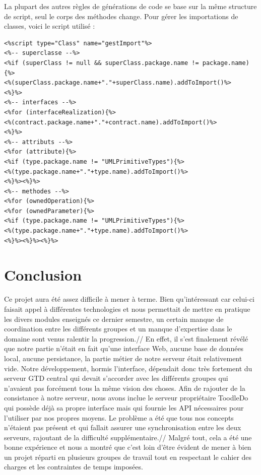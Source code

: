 La plupart des autres règles de générations de code se base sur la même structure de script, seul le corps des méthodes change. Pour gérer les importations de classes, voici le script utilisé :

\begin{verbatim}
<%script type="Class" name="gestImport"%>
<%-- superclasse --%>
<%if (superClass != null && superClass.package.name != package.name){%>
<%(superClass.package.name+"."+superClass.name).addToImport()%>
<%}%>
<%-- interfaces --%>
<%for (interfaceRealization){%>
<%(contract.package.name+"."+contract.name).addToImport()%>
<%}%>
<%-- attributs --%>
<%for (attribute){%>
<%if (type.package.name != "UMLPrimitiveTypes"){%>
<%(type.package.name+"."+type.name).addToImport()%>
<%}%><%}%>
<%-- methodes --%>
<%for (ownedOperation){%>
<%for (ownedParameter){%>
<%if (type.package.name != "UMLPrimitiveTypes"){%>
<%(type.package.name+"."+type.name).addToImport()%>
<%}%><%}%><%}%>
\end{verbatim}


\chapter{Conclusion}

    Ce projet aura été assez difficile à mener à terme. Bien qu'intéressant car celui-ci faisait appel à différentes technologies et nous permettait de mettre en pratique les divers modules enseignés ce dernier semestre, un certain manque de coordination entre les différents groupes et un manque d'expertise dans le domaine sont venus ralentir la progression.// En effet, il s'est finalement révélé que notre partie n'était en fait qu'une interface Web, aucune base de données local, aucune persistance, la partie métier de notre serveur était relativement vide. Notre développement, hormis l'interface, dépendait donc très fortement du serveur GTD central qui devait s'accorder avec les différents groupes qui n'avaient pas forcément tous la même vision des choses. Afin de rajouter de la consistance à notre serveur, nous avons inclue le serveur propriétaire ToodleDo qui possède déjà sa propre interface mais qui fournie les API nécessaires pour l'utiliser par nos propres moyens. Le problème a été que tous nos concepts n'étaient pas présent et qui fallait assurer une synchronisation entre les deux serveurs, rajoutant de la difficulté supplémentaire.// Malgré tout, cela a été une bonne expérience et nous a montré que c'est loin d'être évident de mener à bien un projet réparti en plusieurs groupes de travail tout en respectant le cahier des charges et les contraintes de temps imposées.
